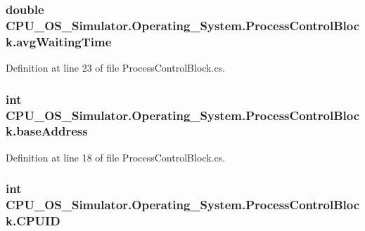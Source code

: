 \subsubsection[{avg\+Waiting\+Time}]{\setlength{\rightskip}{0pt plus 5cm}double C\+P\+U\+\_\+\+O\+S\+\_\+\+Simulator.\+Operating\+\_\+\+System.\+Process\+Control\+Block.\+avg\+Waiting\+Time\hspace{0.3cm}{\ttfamily [private]}}\label{class_c_p_u___o_s___simulator_1_1_operating___system_1_1_process_control_block_ab2aadabc87960312728806d747db342c}


Definition at line 23 of file Process\+Control\+Block.\+cs.

\hypertarget{class_c_p_u___o_s___simulator_1_1_operating___system_1_1_process_control_block_aa539c0c08de4523f8d6e9b21fe4165e6}{}
\subsubsection[{base\+Address}]{\setlength{\rightskip}{0pt plus 5cm}int C\+P\+U\+\_\+\+O\+S\+\_\+\+Simulator.\+Operating\+\_\+\+System.\+Process\+Control\+Block.\+base\+Address\hspace{0.3cm}{\ttfamily [private]}}\label{class_c_p_u___o_s___simulator_1_1_operating___system_1_1_process_control_block_aa539c0c08de4523f8d6e9b21fe4165e6}


Definition at line 18 of file Process\+Control\+Block.\+cs.

\hypertarget{class_c_p_u___o_s___simulator_1_1_operating___system_1_1_process_control_block_abb9341cb0d47b6acb52a4f219d69b600}{}
\subsubsection[{C\+P\+U\+I\+D}]{\setlength{\rightskip}{0pt plus 5cm}int C\+P\+U\+\_\+\+O\+S\+\_\+\+Simulator.\+Operating\+\_\+\+System.\+Process\+Control\+Block.\+C\+P\+U\+I\+D\hspace{0.3cm}{\ttfamily [private]}}\label{class_c_p_u___o_s___simulator_1_1_operating___system_1_1_process_control_block_abb9341cb0d47b6acb52a4f219d69b600}


